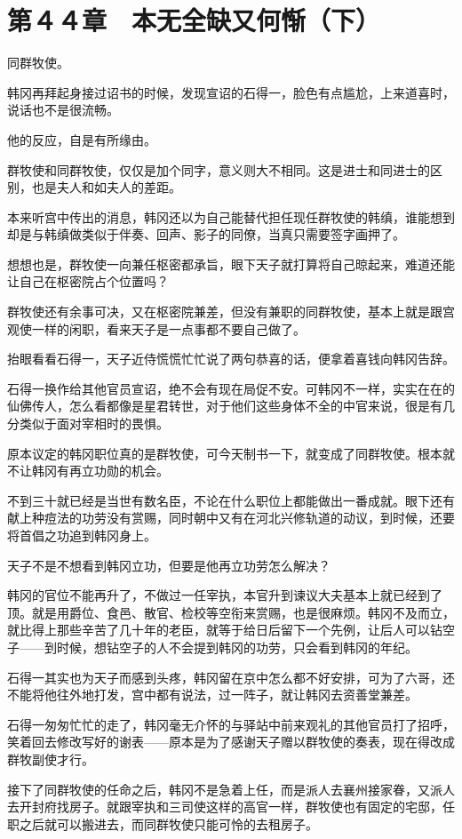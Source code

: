 \section{第４４章　本无全缺又何惭（下）}

同群牧使。

韩冈再拜起身接过诏书的时候，发现宣诏的石得一，脸色有点尴尬，上来道喜时，说话也不是很流畅。

他的反应，自是有所缘由。

群牧使和同群牧使，仅仅是加个同字，意义则大不相同。这是进士和同进士的区别，也是夫人和如夫人的差距。

本来听宫中传出的消息，韩冈还以为自己能替代担任现任群牧使的韩缜，谁能想到却是与韩缜做类似于伴奏、回声、影子的同僚，当真只需要签字画押了。

想想也是，群牧使一向兼任枢密都承旨，眼下天子就打算将自己晾起来，难道还能让自己在枢密院占个位置吗？

群牧使还有余事可决，又在枢密院兼差，但没有兼职的同群牧使，基本上就是跟宫观使一样的闲职，看来天子是一点事都不要自己做了。

抬眼看看石得一，天子近侍慌慌忙忙说了两句恭喜的话，便拿着喜钱向韩冈告辞。

石得一换作给其他官员宣诏，绝不会有现在局促不安。可韩冈不一样，实实在在的仙佛传人，怎么看都像是星君转世，对于他们这些身体不全的中官来说，很是有几分类似于面对宰相时的畏惧。

原本议定的韩冈职位真的是群牧使，可今天制书一下，就变成了同群牧使。根本就不让韩冈有再立功勋的机会。

不到三十就已经是当世有数名臣，不论在什么职位上都能做出一番成就。眼下还有献上种痘法的功劳没有赏赐，同时朝中又有在河北兴修轨道的动议，到时候，还要将首倡之功追到韩冈身上。

天子不是不想看到韩冈立功，但要是他再立功劳怎么解决？

韩冈的官位不能再升了，不做过一任宰执，本官升到谏议大夫基本上就已经到了顶。就是用爵位、食邑、散官、检校等空衔来赏赐，也是很麻烦。韩冈不及而立，就比得上那些辛苦了几十年的老臣，就等于给日后留下一个先例，让后人可以钻空子——到时候，想钻空子的人不会提到韩冈的功劳，只会看到韩冈的年纪。

石得一其实也为天子而感到头疼，韩冈留在京中怎么都不好安排，可为了六哥，还不能将他往外地打发，宫中都有说法，过一阵子，就让韩冈去资善堂兼差。

石得一匆匆忙忙的走了，韩冈毫无介怀的与驿站中前来观礼的其他官员打了招呼，笑着回去修改写好的谢表——原本是为了感谢天子赠以群牧使的奏表，现在得改成群牧副使才行。

接下了同群牧使的任命之后，韩冈不是急着上任，而是派人去襄州接家眷，又派人去开封府找房子。就跟宰执和三司使这样的高官一样，群牧使也有固定的宅邸，任职之后就可以搬进去，而同群牧使只能可怜的去租房子。

